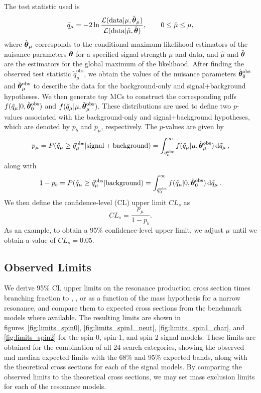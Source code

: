 The test statistic used is
\begin{equation}
  \tilde{q}_\mu=-2\ln\frac{\mathcal{L}(\mathrm{data}|\mu,\hat{\vb*{\theta}}_\mu)}{\mathcal{L}(\mathrm{data}|\hat{\mu},\hat{\vb*{\theta}})},\qquad 0\leq\hat{\mu}\leq\mu,
\end{equation}
where $\hat{\vb*{\theta}}_\mu$ corresponds to the conditional maximum likelihood estimators of the nuisance parameters $\vb*{\theta}$ for a specified signal strength $\mu$ and data, and $\hat{\mu}$ and $\hat{\vb*{\theta}}$ are the estimators for the global maximum of the likelihood.
After finding the observed test statistic $\tilde{q}_\mu^\mathrm{obs}$, we obtain the values of the nuisance parameters $\hat{\vb*{\theta}}_0^\mathrm{obs}$ and $\hat{\vb*{\theta}}_\mu^\mathrm{obs}$ to describe the data for the background-only and signal+background hypotheses.
We then generate toy MCs to construct the corresponding pdfs $f(\tilde{q}_\mu|0,\hat{\vb*{\theta}}_0^\mathrm{obs})$ and $f(\tilde{q}_\mu|\mu,\hat{\vb*{\theta}}_\mu^\mathrm{obs})$.
These distributions are used to define two $p$-values associated with the background-only and signal+background hypotheses, which are denoted by $p_b$ and $p_\mu$, respectively.
The $p$-values are given by
\begin{equation}
  p_\mu=P(\tilde{q}_\mu\geq\tilde{q}_\mu^\mathrm{obs}|\mathrm{signal}+\mathrm{background})=\int_{\tilde{q}_\mu^\mathrm{obs}}^\infty f(\tilde{q}_\mu|\mu,\hat{\vb*{\theta}}_\mu^\mathrm{obs})\dd{\tilde{q}_\mu},
\end{equation}
along with
\begin{equation}
  1-p_b=P(\tilde{q}_\mu\geq\tilde{q}_\mu^\mathrm{obs}|\mathrm{background})=\int_{\tilde{q}_0^\mathrm{obs}}^\infty f(\tilde{q}_\mu|0,\hat{\vb*{\theta}}_0^\mathrm{obs})\dd{\tilde{q}_\mu}.
\end{equation}
We then define the confidence-level (CL) upper limit $CL_s$ as
\begin{equation}
  CL_s=\frac{p_\mu}{1-p_b}.
\end{equation}
As an example, to obtain a 95\% confidence-level upper limit, we adjust $\mu$ until we obtain a value of $CL_s=0.05$.

\subsection{Observed Limits}

We derive 95\% CL upper limits on the resonance production cross section times branching fraction to \WW, \WZ, or \WH as a function of the mass hypothesis \MX for a narrow resonance, and compare them to expected cross sections from the benchmark models where available.
The resulting limits are shown in figures~\ref{fig:limits_spin0}, \ref{fig:limits_spin1_neut}, \ref{fig:limits_spin1_char}, and \ref{fig:limits_spin2} for the spin-0, spin-1, and spin-2 signal models.
These limits are obtained for the combination of all 24 search categories, showing the observed and median expected limits with the 68\% and 95\% expected bands, along with the theoretical cross sections for each of the signal models.
By comparing the observed limits to the theoretical cross sections, we may set mass exclusion limits for each of the resonance models.


